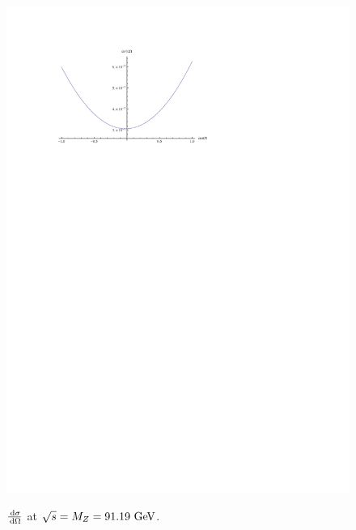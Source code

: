 \documentclass[]{article}
\begin{document}
\begin{figure}[H]
{		\includegraphics[scale=0.7]{sm_exact}
	}
	\caption{$\frac{\,\operatorname{d}\!{\sigma}}{\,\operatorname{d}\!{\Omega}}$ at $\sqrt{s}=M_{\Zzero}=91.19\GeV$.}
	\label{fig:diffexact}
\end{figure}
\end{document}
